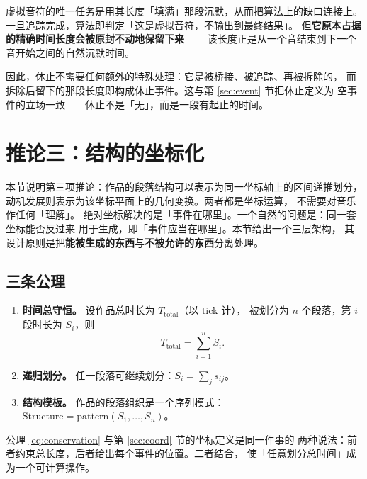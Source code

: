 \documentclass[11pt,a4paper,fontset=none]{ctexart}
\begin{document}
\begin{观察}[过河拆桥]
虚拟音符的唯一任务是用其长度「填满」那段沉默，从而把算法上的缺口连接上。
一旦追踪完成，算法即判定「这是虚拟音符，不输出到最终结果」。
但\textbf{它原本占据的精确时间长度会被原封不动地保留下来}——
该长度正是从一个音结束到下一个音开始之间的自然沉默时间。
\end{观察}

因此，休止不需要任何额外的特殊处理：它是被桥接、被追踪、再被拆除的，
而拆除后留下的那段长度即构成休止事件。这与第 \ref{sec:event} 节把休止定义为
空事件的立场一致——休止不是「无」，而是一段有起止的时间。

\section{推论三：结构的坐标化}
\label{sec:gen}

本节说明第三项推论：作品的段落结构可以表示为同一坐标轴上的区间递推划分，
动机发展则表示为该坐标平面上的几何变换。两者都是坐标运算，
不需要对音乐作任何「理解」。
绝对坐标解决的是「事件在哪里」。一个自然的问题是：同一套坐标能否反过来
用于生成，即「事件应当在哪里」。本节给出一个三层架构，
其设计原则是把\textbf{能被生成的东西}与\textbf{不被允许的东西}分离处理。

\subsection{三条公理}

\begin{enumerate}[leftmargin=2.2em,itemsep=0.15em,topsep=0.2em]
  \item \textbf{时间总守恒。} 设作品总时长为 $T_{\mathrm{total}}$（以 tick 计），
        被划分为 $n$ 个段落，第 $i$ 段时长为 $S_i$，则
        \begin{equation}
          \label{eq:conservation}
          T_{\mathrm{total}} = \sum_{i=1}^{n} S_i .
        \end{equation}
  \item \textbf{递归划分。} 任一段落可继续划分：$S_i = \sum_j s_{ij}$。
  \item \textbf{结构模板。} 作品的段落组织是一个序列模式：
        $\mathrm{Structure} = \mathrm{pattern}(S_1,\dots,S_n)$。
\end{enumerate}

\begin{注记}
公理 \eqref{eq:conservation} 与第 \ref{sec:coord} 节的坐标定义是同一件事的
两种说法：前者约束总长度，后者给出每个事件的位置。二者结合，
使「任意划分总时间」成为一个可计算操作。
\end{注记}
\end{document}
